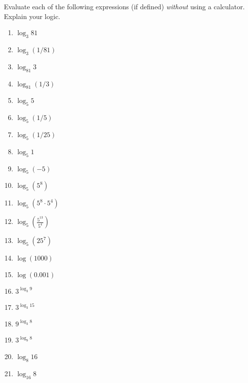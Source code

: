 \documentclass{ximera}
\begin{document}
\begin{question}  \label{Qdr435rtdfgfg}
Evaluate each of the following expressions (if defined) \emph{without} using a calculator. Explain your logic.
\begin{enumerate}
\item $\log_3 81$

\item $\log_3 (1/81)$

\item $\log_{81}3$

\item $\log_{81} (1/3)$

\item $\log_5 5$

\item $\log_5 (1/5)$

\item $\log_5 (1/25)$

\item $\log_5 1$

\item $\log_5(-5)$

\item $\log_5 (5^8)$

\item $\log_5(5^8 \cdot 5^4)$

\item $\log_5\left(  \frac{5^{13}}{5^{4}} \right)$

\item $\log_5(25^7)$

\item $\log (1000)$

\item $\log (0.001)$

\item $3^{\log_3 9}$

\item $3^{\log_3 15}$

\item $9^{\log_3 8}$

\item $3^{\log_9 8}$

\item $\log_8 16$

\item $\log_{16}8$

\end{enumerate}
\end{question}
\end{document}
